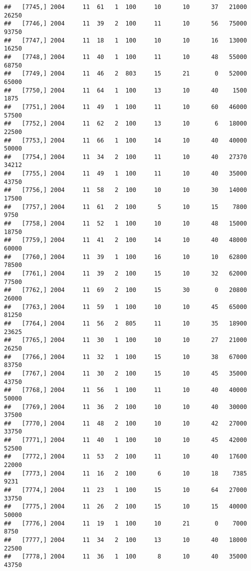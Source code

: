 \documentclass{article}\usepackage[]{graphicx}\usepackage[]{color}
\makeatletter
\newenvironment{kframe}{%
 \def\at@end@of@kframe{}%
 \ifinner\ifhmode%
  \def\at@end@of@kframe{\end{minipage}}%
  \begin{minipage}{\columnwidth}%
 \fi\fi%
 \def\FrameCommand##1{\hskip\@totalleftmargin \hskip-\fboxsep
 \colorbox{shadecolor}{##1}\hskip-\fboxsep
     \hskip-\linewidth \hskip-\@totalleftmargin \hskip\columnwidth}%
 \MakeFramed {\advance\hsize-\width
   \@totalleftmargin\z@ \linewidth\hsize
   \@setminipage}}%
 {\par\unskip\endMakeFramed%
 \at@end@of@kframe}
\newenvironment{knitrout}{}{} %
\makeatother
\begin{document}
\begin{knitrout}
\begin{kframe}
\begin{verbatim}
##   [7745,] 2004     11  61   1  100     10      10      37   21000   26250
##   [7746,] 2004     11  39   2  100     11      10      56   75000   93750
##   [7747,] 2004     11  18   1  100     10      10      16   13000   16250
##   [7748,] 2004     11  40   1  100     11      10      48   55000   68750
##   [7749,] 2004     11  46   2  803     15      21       0   52000   65000
##   [7750,] 2004     11  64   1  100     13      10      40    1500    1875
##   [7751,] 2004     11  49   1  100     11      10      60   46000   57500
##   [7752,] 2004     11  62   2  100     13      10       6   18000   22500
##   [7753,] 2004     11  66   1  100     14      10      40   40000   50000
##   [7754,] 2004     11  34   2  100     11      10      40   27370   34212
##   [7755,] 2004     11  49   1  100     11      10      40   35000   43750
##   [7756,] 2004     11  58   2  100     10      10      30   14000   17500
##   [7757,] 2004     11  61   2  100      5      10      15    7800    9750
##   [7758,] 2004     11  52   1  100     10      10      48   15000   18750
##   [7759,] 2004     11  41   2  100     14      10      40   48000   60000
##   [7760,] 2004     11  39   1  100     16      10      10   62800   78500
##   [7761,] 2004     11  39   2  100     15      10      32   62000   77500
##   [7762,] 2004     11  69   2  100     15      30       0   20800   26000
##   [7763,] 2004     11  59   1  100     10      10      45   65000   81250
##   [7764,] 2004     11  56   2  805     11      10      35   18900   23625
##   [7765,] 2004     11  30   1  100     10      10      27   21000   26250
##   [7766,] 2004     11  32   1  100     15      10      38   67000   83750
##   [7767,] 2004     11  30   2  100     15      10      45   35000   43750
##   [7768,] 2004     11  56   1  100     11      10      40   40000   50000
##   [7769,] 2004     11  36   2  100     10      10      40   30000   37500
##   [7770,] 2004     11  48   2  100     10      10      42   27000   33750
##   [7771,] 2004     11  40   1  100     10      10      45   42000   52500
##   [7772,] 2004     11  53   2  100     11      10      40   17600   22000
##   [7773,] 2004     11  16   2  100      6      10      18    7385    9231
##   [7774,] 2004     11  23   1  100     15      10      64   27000   33750
##   [7775,] 2004     11  26   2  100     15      10      15   40000   50000
##   [7776,] 2004     11  19   1  100     10      21       0    7000    8750
##   [7777,] 2004     11  34   2  100     13      10      40   18000   22500
##   [7778,] 2004     11  36   1  100      8      10      40   35000   43750

\end{verbatim}
\end{kframe}
\end{knitrout}
\end{document}
